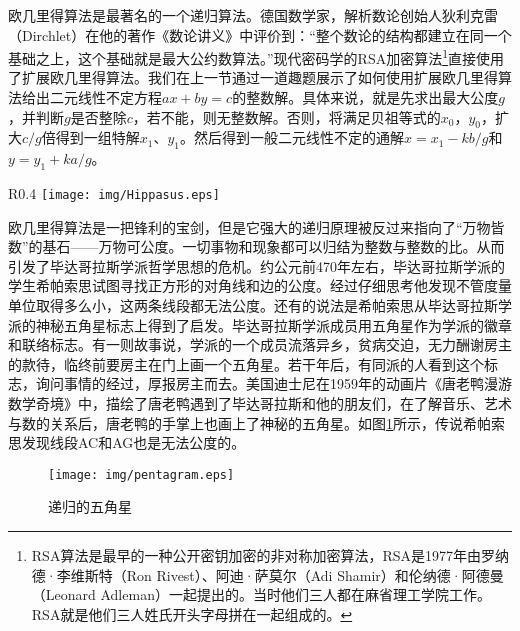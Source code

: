 \documentclass{article}
\begin{document}
欧几里得算法是最著名的一个递归算法。德国数学家，解析数论创始人狄利克雷（Dirchlet）在他的著作《数论讲义》中评价到：“整个数论的结构都建立在同一个基础之上，这个基础就是最大公约数算法。”现代密码学的RSA加密算法\footnote{RSA算法是最早的一种公开密钥加密的非对称加密算法，RSA是1977年由罗纳德·李维斯特（Ron Rivest）、阿迪·萨莫尔（Adi Shamir）和伦纳德·阿德曼（Leonard Adleman）一起提出的。当时他们三人都在麻省理工学院工作。RSA就是他们三人姓氏开头字母拼在一起组成的。}直接使用了扩展欧几里得算法。我们在上一节通过一道趣题展示了如何使用扩展欧几里得算法给出二元线性不定方程$ax + by = c$的整数解。具体来说，就是先求出最大公度$g$，并判断$g$是否整除$c$，若不能，则无整数解。否则，将满足贝祖等式的$x_0$，$y_0$，扩大$c/g$倍得到一组特解$x_1$、$y_1$。然后得到一般二元线性不定的通解$x = x_1 - k b / g$和$y = y_1 + k a / g$。

\begin{wrapfigure}{R}{0.4\textwidth}
 \centering
 \texttt{[image: img/Hippasus.eps]}
 \captionsetup{labelformat=empty}
 \caption{希帕索思（Hippasus of Metapontum）约公元前五世纪。}
 \label{fig:Hippasus}
\end{wrapfigure}

欧几里得算法是一把锋利的宝剑，但是它强大的递归原理被反过来指向了“万物皆数”的基石——万物可公度。一切事物和现象都可以归结为整数与整数的比。从而引发了毕达哥拉斯学派哲学思想的危机。约公元前470年左右，毕达哥拉斯学派的学生希帕索思试图寻找正方形的对角线和边的公度。经过仔细思考他发现不管度量单位取得多么小，这两条线段都无法公度。还有的说法是希帕索思从毕达哥拉斯学派的神秘五角星标志上得到了启发。毕达哥拉斯学派成员用五角星作为学派的徽章和联络标志。有一则故事说，学派的一个成员流落异乡，贫病交迫，无力酬谢房主的款待，临终前要房主在门上画一个五角星。若干年后，有同派的人看到这个标志，询问事情的经过，厚报房主而去\cite{HanXueTao16}。美国迪士尼在1959年的动画片《唐老鸭漫游数学奇境》中，描绘了唐老鸭遇到了毕达哥拉斯和他的朋友们，在了解音乐、艺术与数的关系后，唐老鸭的手掌上也画上了神秘的五角星。如图\ref{fig:pentagram}所示，传说希帕索思发现线段AC和AG也是无法公度的。


\begin{figure}[htbp]
 \centering
 \texttt{[image: img/pentagram.eps]}
 \caption{递归的五角星}
 \label{fig:pentagram}
\end{figure}
\end{document}
